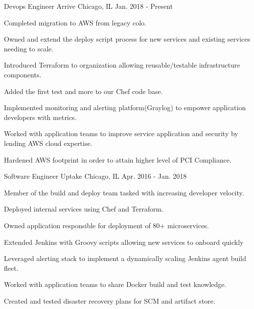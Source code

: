 

\begin{cventries}

  \cventry
    {Devops Engineer} %
    {Arrive} %
    {Chicago, IL} %
    {Jan. 2018 - Present} %
    {
      \begin{cvitems} %
        \item {Completed migration to AWS from legacy colo.}
        \item {Owned and extend the deploy script process for new services and existing services needing to scale.}
        \item {Introduced Terraform to organization allowing reusable/testable infrastructure components.}
        \item {Added the first test and more to our Chef code base.}
        \item {Implemented monitoring and alerting platform(Graylog) to empower application developers with metrics.}
        \item {Worked with application teams to improve service application and security by lending AWS cloud expertise.}
        \item {Hardened AWS footprint in order to attain higher level of PCI Compliance.}
      \end{cvitems}
    }

  \cventry
    {Software Engineer} %
    {Uptake} %
    {Chicago, IL} %
    {Apr. 2016 - Jan. 2018} %
    {
      \begin{cvitems} %
        \item {Member of the build and deploy team tasked with increasing developer velocity.}
        \item {Deployed internal services using Chef and Terraform.}
        \item {Owned application responsible for deployment of 80+ microservices.}
        \item {Extended Jenkins with Groovy scripts allowing new services to onboard quickly}
        \item {Leveraged alerting stack to implement a dynamically scaling Jenkins agent build fleet.}
        \item {Worked with application teams to share Docker build and test knowledge.}
        \item {Created and tested disaster recovery plans for SCM and artifact store.}
      \end{cvitems}
    }

\end{cventries}
